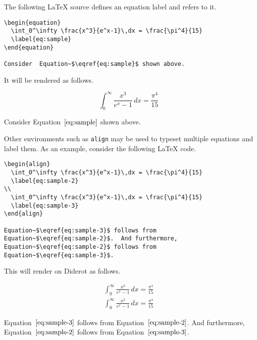 \begin{example}
The following LaTeX source defines an equation label and refers to it. 

\begin{lstlisting}
\begin{equation}
  \int_0^\infty \frac{x^3}{e^x-1}\,dx = \frac{\pi^4}{15}
  \label{eq:sample}
\end{equation}

Consider  Equation~$\eqref{eq:sample}$ shown above.
\end{lstlisting}

It will be rendered as follows.

\begin{equation}
  \int_0^\infty \frac{x^3}{e^x-1}\,dx = \frac{\pi^4}{15}
  \label{eq:sample}
\end{equation}

Consider Equation~$\eqref{eq:sample}$ shown above.


\end{example}

\begin{example}
Other environments such as \lstinline`align` may be used to typeset multiple equations and label them. 
%
As an example, consider the following LaTeX code.

\begin{lstlisting}
\begin{align}
  \int_0^\infty \frac{x^3}{e^x-1}\,dx = \frac{\pi^4}{15}
  \label{eq:sample-2}
\\
  \int_0^\infty \frac{x^3}{e^x-1}\,dx = \frac{\pi^4}{15}
  \label{eq:sample-3}
\end{align}

Equation~$\eqref{eq:sample-3}$ follows from Equation~$\eqref{eq:sample-2}$.  And furthermore, Equation~$\eqref{eq:sample-2}$ follows from Equation~$\eqref{eq:sample-3}$.  
\end{lstlisting}

This will render on Diderot as follows.

\begin{align}
  \int_0^\infty \frac{x^3}{e^x-1}\,dx = \frac{\pi^4}{15}
  \label{eq:sample-2}
\\
  \int_0^\infty \frac{x^3}{e^x-1}\,dx = \frac{\pi^4}{15}
  \label{eq:sample-3}
\end{align}

Equation~$\eqref{eq:sample-3}$ follows from Equation~$\eqref{eq:sample-2}$.  And furthermore, Equation~$\eqref{eq:sample-2}$ follows from Equation~$\eqref{eq:sample-3}$.  
\end{example}

